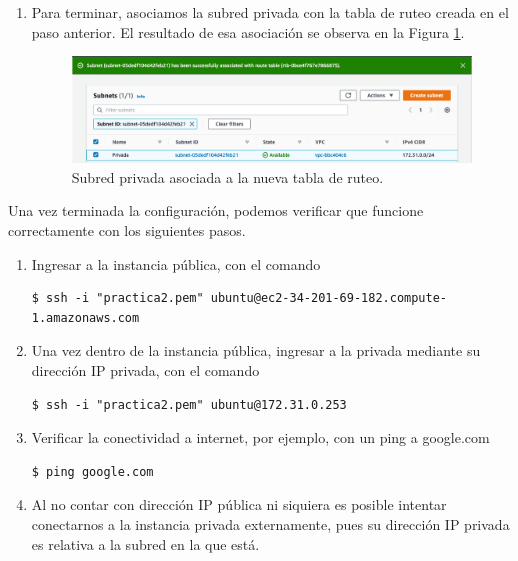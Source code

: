 \documentclass{article}
\begin{document}
\begin{enumerate}
  \item Para terminar, asociamos la subred privada con
    la tabla de ruteo creada en el paso anterior. El
    resultado de esa asociaci\'on se observa en la Figura
    \ref{fig:subnetRouteTable}.
    \begin{figure}[H]
      \centering
      \includegraphics[width=\textwidth]{SSNAT/subnetRouteTable}
      \caption{Subred privada asociada a la nueva tabla
      de ruteo.}
      \label{fig:subnetRouteTable}
    \end{figure}
\end{enumerate}

Una vez terminada la configuraci\'on, podemos verificar
que funcione correctamente con los siguientes pasos.

\begin{enumerate}
  \item Ingresar a la instancia p\'ublica, con el
    comando
\begin{lstlisting}
$ ssh -i "practica2.pem" ubuntu@ec2-34-201-69-182.compute-1.amazonaws.com
\end{lstlisting}

  \item Una vez dentro de la instancia p\'ublica, ingresar
    a la privada mediante su direcci\'on IP privada, con
    el comando
\begin{lstlisting}
$ ssh -i "practica2.pem" ubuntu@172.31.0.253
\end{lstlisting}

  \item Verificar la conectividad a internet, por
    ejemplo, con un ping a google.com
\begin{lstlisting}
$ ping google.com
\end{lstlisting}

  \item Al no contar con direcci\'on IP p\'ublica
    ni siquiera es posible intentar conectarnos a
    la instancia privada externamente, pues su
    direcci\'on IP privada es relativa a la subred
    en la que est\'a.
\end{enumerate}
\end{document}
